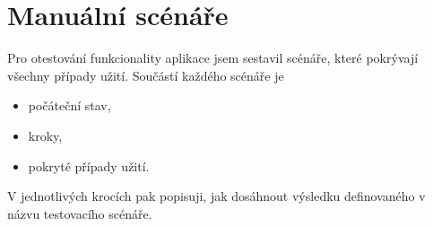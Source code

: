 \section{Manuální scénáře}
Pro otestování funkcionality aplikace jsem sestavil scénáře, které pokrývají všechny případy užití.
Součástí každého scénáře je
\begin{itemize}
    \item počáteční stav,
    \item kroky,
    \item pokryté případy užití.
\end{itemize}

V jednotlivých krocích pak popisuji, jak dosáhnout výsledku definovaného v názvu testovacího scénáře.



